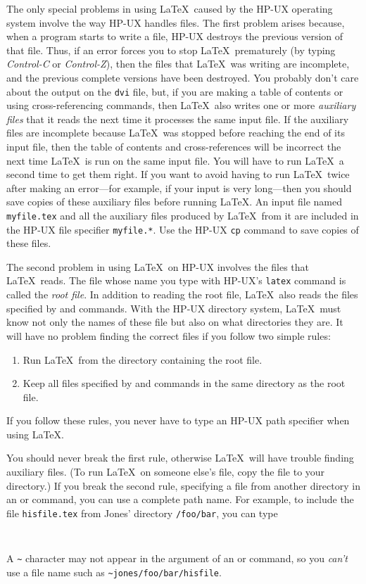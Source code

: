 \documentclass{article}
\begin{document}
The only special problems in using \LaTeX\ caused by the HP-UX
operating system involve the way HP-UX handles files.  The first
problem arises because, when a program starts to write a file, HP-UX
destroys the previous version of that file.  Thus, if an error forces
you to stop \LaTeX\ prematurely (by typing {\em Control-C\/} or {\em
Control-Z\/}), then the files that \LaTeX\ was writing are incomplete,
and the previous complete versions have been destroyed.  You probably
don't care about the output on the {\tt dvi} file, but, if you are
making a table of contents or using cross-referencing commands, then
\LaTeX\ also writes one or more {\em auxiliary files\/} that it reads
the next time it processes the same input file.  If the auxiliary files
are incomplete because \LaTeX\ was stopped before reaching the end of
its input file, then the table of contents and cross-references will be
incorrect the next time \LaTeX\ is run on the same input file.  You
will have to run \LaTeX\ a second time to get them right.  If you want
to avoid having to run \LaTeX\ twice after making an error---for
example, if your input is very long---then you should save copies of
these auxiliary files before running \LaTeX. An input file named
\mbox{\tt myfile.tex} and all the auxiliary files produced by \LaTeX\
from it are included in the HP-UX file specifier \mbox{\tt myfile.*}.
Use the HP-UX {\tt cp} command to save copies of these files.

The second problem in using \LaTeX\ on HP-UX involves the files that
\LaTeX\ reads.  The file whose name you type with HP-UX's {\tt latex}
command is called the {\em root file}.  In addition to reading the root
file, \LaTeX\ also reads the files specified by \hbox{\verb||}
and \hbox{\verb||} commands.  With the HP-UX directory system,
\LaTeX\ must know not only the names of these file but also on what
directories they are.  It will have no problem finding the correct
files if you follow two simple rules:
\begin{enumerate}
 \item Run \LaTeX\ from the directory containing the root file.
 \item Keep all files specified by \hbox{\verb||} and 
      \hbox{\verb||} commands in the same directory as the root
       file.
\end{enumerate}
If you follow these rules, you never have to type an HP-UX path
specifier when using \LaTeX.

You should never break the first rule, otherwise \LaTeX\ will have
trouble finding auxiliary files.  (To run \LaTeX\ on someone else's
file, copy the file to your directory.) If you break the second
rule, specifying a file from another directory in an
\hbox{\verb||} or \hbox{\verb||} command, you can use a
complete path name.  For example, to include the file \mbox{\tt hisfile.tex} 
from Jones' directory \hbox{\verb|/foo/bar|}, you can type
\begin{verbatim}
     
\end{verbatim}
A \verb|~| character may not appear in the argument of an
\hbox{\verb||} or \hbox{\verb||} command, so you {\em
can't\/} use a file name such as \hbox{\verb|~jones/foo/bar/hisfile|}.
\end{document}

